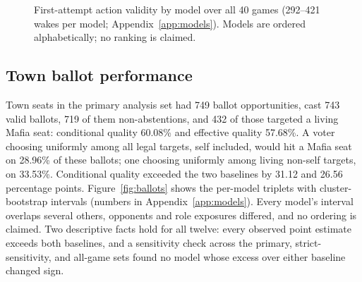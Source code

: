 \documentclass[11pt]{article}
\begin{document}
\begin{figure}[H]
\centering
{}
\caption{First-attempt action validity by model over all 40 games (292--421 wakes per model; Appendix~\ref{app:models}). Models are ordered alphabetically; no ranking is claimed.}
\label{fig:validity}
\end{figure}

\FloatBarrier
\subsection{Town ballot performance}

Town seats in the primary analysis set had 749 ballot opportunities, cast 743 valid ballots, 719 of them non-abstentions, and 432 of those targeted a living Mafia seat: conditional quality 60.08\% and effective quality 57.68\%. A voter choosing uniformly among all legal targets, self included, would hit a Mafia seat on 28.96\% of these ballots; one choosing uniformly among living non-self targets, on 33.53\%. Conditional quality exceeded the two baselines by 31.12 and 26.56 percentage points. Figure~\ref{fig:ballots} shows the per-model triplets with cluster-bootstrap intervals (numbers in Appendix~\ref{app:models}). Every model's interval overlaps several others, opponents and role exposures differed, and no ordering is claimed. Two descriptive facts hold for all twelve: every observed point estimate exceeds both baselines, and a sensitivity check across the primary, strict-sensitivity, and all-game sets found no model whose excess over either baseline changed sign.
\end{document}
